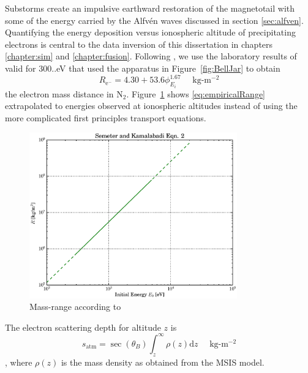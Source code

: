 Substorms create an impulsive earthward restoration of the magnetotail with some of the energy carried by the Alfvén waves discussed in section \ref{sec:alfven}. 
Quantifying the energy deposition versus ionospheric altitude of precipitating electrons is central to the data inversion of this dissertation in chapters \ref{chapter:sim} and \ref{chapter:fusion}. 
Following \citet{rees1989}, we use the laboratory results of \citet{barrett1976} valid for 300..\unit[5000]{eV} that used the apparatus in Figure~\ref{fig:BellJar} to obtain
\begin{equation}\label{eq:empiricalRange}
R_{\textrm{e}^-} = 4.30 + 53.6\phi^{1.67}_{E_i}  \quad \textrm{ kg-m$^{-2}$} 
\end{equation} %
the electron mass distance in N$_2$. 
Figure~\ref{fig:empR} shows \eqref{eq:empiricalRange}  extrapolated to energies observed at ionospheric altitudes instead of using the more complicated first principles transport equations. %
\begin{figure}\centering
    \includegraphics[width=0.8\textwidth,trim=30 10 30 20,clip]{gfx/JLSkamalabadiEqn2.eps}
    \caption{Mass-range according to \citet{semeter2005}}\label{fig:empR}
\end{figure}
The electron scattering depth for altitude $z$ is
\begin{equation}\label{eq:satm}
s_{\textrm{atm}} = \sec{\left( \theta_B \right)}\int_z^\infty \rho(z)\textrm{d}z \quad \textrm{ kg-m$^{-2}$} 
\end{equation}
\citep{semeter2005}, where $\rho(z)$ is the mass density as obtained from the MSIS model. 

